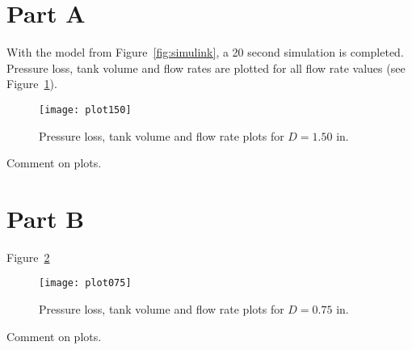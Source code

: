 \section{Part A}
\label{sect:3a}

With the model from Figure~\ref{fig:simulink}, a 20 second simulation is completed. Pressure loss, tank volume and flow rates are plotted for all flow rate values (see Figure~\ref{fig:plot150}).

\begin{figure}[H]
	\centering
	\texttt{[image: plot150]}
	\caption{Pressure loss, tank volume and flow rate plots for $D=1.50$ in.}
	\label{fig:plot150}
\end{figure}

Comment on plots.

\section{Part B}
\label{sect:3b}

Figure~\ref{fig:plot075}

\begin{figure}[H]
	\centering
	\texttt{[image: plot075]}
	\caption{Pressure loss, tank volume and flow rate plots for $D=0.75$ in.}
	\label{fig:plot075}
\end{figure}

Comment on plots.


